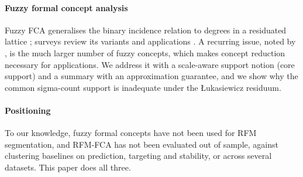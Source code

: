 \paragraph{Fuzzy formal concept analysis} Fuzzy FCA generalises the binary incidence relation to degrees in a residuated lattice \citep{burusco1994,pollandt1997,belohlavek2002,belohlavek2004}; surveys review its variants and applications \citep{poelmans2014,alwersh2022}. A recurring issue, noted by \citet{alwersh2022}, is the much larger number of fuzzy concepts, which makes concept reduction necessary for applications. We address it with a scale-aware support notion (core support) and a summary with an approximation guarantee, and we show why the common sigma-count support is inadequate under the Łukasiewicz residuum.

\paragraph{Positioning} To our knowledge, fuzzy formal concepts have not been used for RFM segmentation, and RFM-FCA has not been evaluated out of sample, against clustering baselines on prediction, targeting and stability, or across several datasets. This paper does all three.
